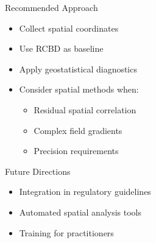 \begin{frame}
\begin{columns}[T]
        \begin{column}{0.5\textwidth}
            \begin{block}{Recommended Approach}
                \begin{itemize}
                    \item Collect spatial coordinates
                    \item Use RCBD as baseline
                    \item Apply geostatistical diagnostics
                    \item Consider spatial methods when:
                    \begin{itemize}
                        \scriptsize
                        \item Residual spatial correlation
                        \item Complex field gradients
                        \item Precision requirements
                    \end{itemize}
                \end{itemize}
            \end{block}
            
            \begin{block}{Future Directions}
                \begin{itemize}
                    \item Integration in regulatory guidelines
                    \item Automated spatial analysis tools
                    \item Training for practitioners
                \end{itemize}
            \end{block}
        \end{column}
    \end{columns}
\end{frame}

